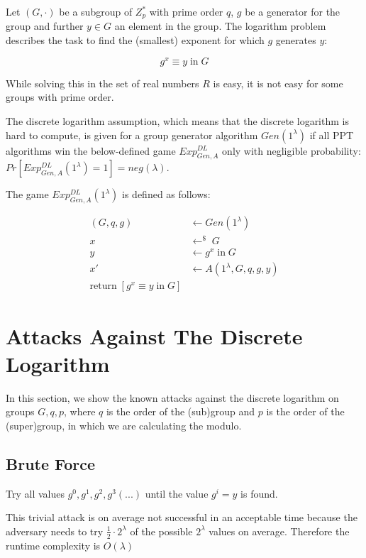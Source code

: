 Let $(G, \cdot)$ be a subgroup of $Z_p^*$ with prime order $q$, $g$ be a generator for the group and further $y \in G$ an element in the group.
The logarithm problem describes the task to find the (smallest) exponent for which $g$ generates $y$:

$$
    g^x \equiv y \; \text{in} \; G
$$

While solving this in the set of real numbers $R$ is easy, it is not easy for some groups with prime order.

The discrete logarithm assumption, which means that the discrete logarithm is hard to compute, is given for a group generator algorithm $Gen(1^\lambda)$ if all PPT algorithms win the below-defined game $Exp^{DL}_{Gen,A}$ only with negligible probability: $Pr[Exp^{DL}_{Gen,A}(1^\lambda) = 1] = neg(\lambda)$.

The game $Exp^{DL}_{Gen,A}(1^\lambda)$ is defined as follows:

\begin{align*}
    (G, q, g) & \leftarrow Gen(1^\lambda)           \\
    x         & \leftarrow^\$ \; G                  \\
    y         & \leftarrow g^x \; \text{in} \; G    \\
    x'        & \leftarrow A(1^\lambda, G, q, g, y) \\
    \text{return} \; [g^x \equiv y \; \text{in} \; G ]
\end{align*}

\section{Attacks Against The Discrete Logarithm}

In this section, we show the known attacks against the discrete logarithm on groups $G, q, p$, where $q$ is the order of the (sub)group and $p$ is the order of the (super)group, in which we are calculating the modulo.

\subsection{Brute Force}

Try all values $g^0, g^1, g^2, g^3 (...)$ until the value $g^i = y$ is found.

This trivial attack is on average not successful in an acceptable time because the adversary needs to try $\frac{1}{2} \cdot 2^\lambda$ of the possible $2^\lambda$ values on average. Therefore the runtime complexity is $O(\lambda)$

